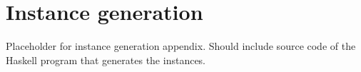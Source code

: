 \section{Instance generation}

Placeholder for instance generation appendix. Should include source code of the Haskell program that generates the instances.
